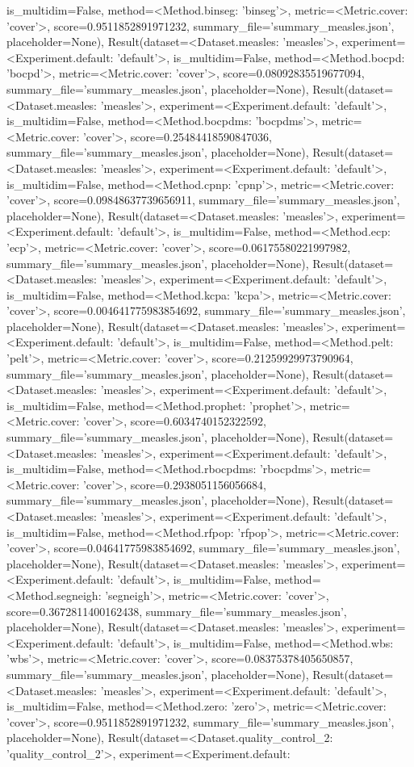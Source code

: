 is_multidim=False, method=<Method.binseg: 'binseg'>, metric=<Metric.cover: 'cover'>, score=0.9511852891971232, summary_file='summary_measles.json', placeholder=None), Result(dataset=<Dataset.measles: 'measles'>, experiment=<Experiment.default: 'default'>, is_multidim=False, method=<Method.bocpd: 'bocpd'>, metric=<Metric.cover: 'cover'>, score=0.08092835519677094, summary_file='summary_measles.json', placeholder=None), Result(dataset=<Dataset.measles: 'measles'>, experiment=<Experiment.default: 'default'>, is_multidim=False, method=<Method.bocpdms: 'bocpdms'>, metric=<Metric.cover: 'cover'>, score=0.25484418590847036, summary_file='summary_measles.json', placeholder=None), Result(dataset=<Dataset.measles: 'measles'>, experiment=<Experiment.default: 'default'>, is_multidim=False, method=<Method.cpnp: 'cpnp'>, metric=<Metric.cover: 'cover'>, score=0.09848637739656911, summary_file='summary_measles.json', placeholder=None), Result(dataset=<Dataset.measles: 'measles'>, experiment=<Experiment.default: 'default'>, is_multidim=False, method=<Method.ecp: 'ecp'>, metric=<Metric.cover: 'cover'>, score=0.06175580221997982, summary_file='summary_measles.json', placeholder=None), Result(dataset=<Dataset.measles: 'measles'>, experiment=<Experiment.default: 'default'>, is_multidim=False, method=<Method.kcpa: 'kcpa'>, metric=<Metric.cover: 'cover'>, score=0.004641775983854692, summary_file='summary_measles.json', placeholder=None), Result(dataset=<Dataset.measles: 'measles'>, experiment=<Experiment.default: 'default'>, is_multidim=False, method=<Method.pelt: 'pelt'>, metric=<Metric.cover: 'cover'>, score=0.21259929973790964, summary_file='summary_measles.json', placeholder=None), Result(dataset=<Dataset.measles: 'measles'>, experiment=<Experiment.default: 'default'>, is_multidim=False, method=<Method.prophet: 'prophet'>, metric=<Metric.cover: 'cover'>, score=0.6034740152322592, summary_file='summary_measles.json', placeholder=None), Result(dataset=<Dataset.measles: 'measles'>, experiment=<Experiment.default: 'default'>, is_multidim=False, method=<Method.rbocpdms: 'rbocpdms'>, metric=<Metric.cover: 'cover'>, score=0.2938051156056684, summary_file='summary_measles.json', placeholder=None), Result(dataset=<Dataset.measles: 'measles'>, experiment=<Experiment.default: 'default'>, is_multidim=False, method=<Method.rfpop: 'rfpop'>, metric=<Metric.cover: 'cover'>, score=0.04641775983854692, summary_file='summary_measles.json', placeholder=None), Result(dataset=<Dataset.measles: 'measles'>, experiment=<Experiment.default: 'default'>, is_multidim=False, method=<Method.segneigh: 'segneigh'>, metric=<Metric.cover: 'cover'>, score=0.3672811400162438, summary_file='summary_measles.json', placeholder=None), Result(dataset=<Dataset.measles: 'measles'>, experiment=<Experiment.default: 'default'>, is_multidim=False, method=<Method.wbs: 'wbs'>, metric=<Metric.cover: 'cover'>, score=0.08375378405650857, summary_file='summary_measles.json', placeholder=None), Result(dataset=<Dataset.measles: 'measles'>, experiment=<Experiment.default: 'default'>, is_multidim=False, method=<Method.zero: 'zero'>, metric=<Metric.cover: 'cover'>, score=0.9511852891971232, summary_file='summary_measles.json', placeholder=None), Result(dataset=<Dataset.quality_control_2: 'quality_control_2'>, experiment=<Experiment.default: 